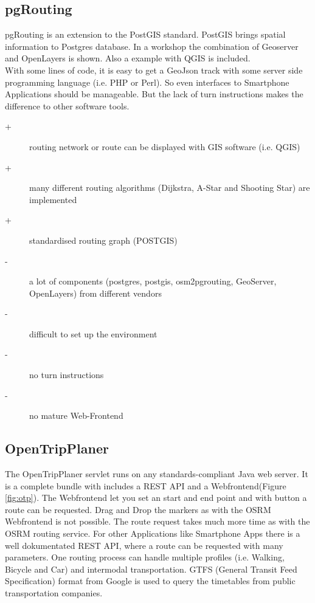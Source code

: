 \documentclass{sig-alternate}
\begin{document}
\subsection{pgRouting\cite{pgrouting}}
pgRouting is an extension to the PostGIS standard. PostGIS brings spatial information to Postgres database. 
In a workshop the combination of Geoserver and OpenLayers is shown. Also a example with QGIS is included. \\
With some lines of code, it is easy to get a GeoJson track with  some server side programming language (i.e. PHP or Perl). So even interfaces to Smartphone Applications should be manageable. But the lack of turn instructions makes the difference to other software tools.  

\begin{description}
  \item[+] routing network or route can be displayed with GIS software (i.e. QGIS)
  \item[+] many different routing algorithms (Dijkstra, A-Star and Shooting Star)  are implemented
  \item[+] standardised routing graph (POSTGIS)
  \item[-] a lot of components (postgres, postgis, osm2pgrouting, GeoServer, OpenLayers) from different vendors   
  \item[-] difficult to set up the environment 
  \item[-] no turn instructions
  \item[-] no mature Web-Frontend  
\end{description} 




\subsection{OpenTripPlaner}
\label{subsec:otp}
 
The OpenTripPlaner servlet runs on any standards-compliant Java web server. It is a complete bundle with includes a REST API and a Webfrontend(Figure \ref{fig:otp}). The Webfrontend let you set an start and end point and with button a route can be requested. Drag and Drop the markers as with the OSRM Webfrontend is not possible. The route request takes much more time as with the OSRM routing service. For other Applications like Smartphone Apps there is a well dokumentated REST API, where a route can be requested with many parameters. One routing process can handle multiple profiles (i.e. Walking, Bicycle and Car) and intermodal transportation. GTFS (General Transit Feed Specification) format from Google is used to query the timetables from public transportation companies. 
\end{document}
